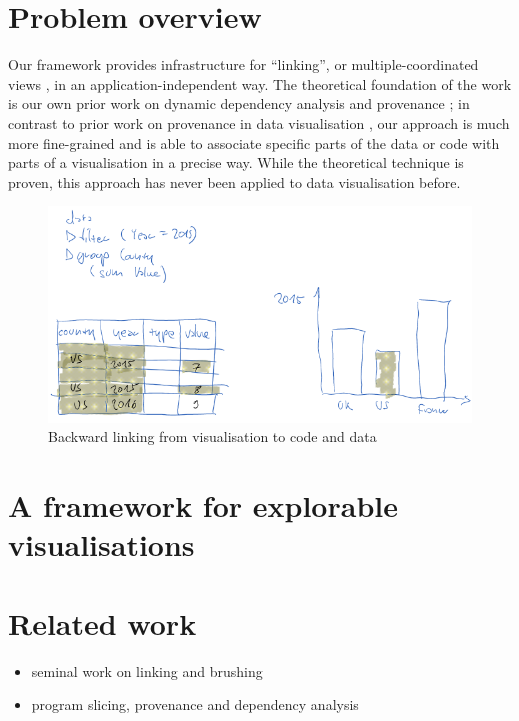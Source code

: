 \cite{becker87,buja91}

\section{Problem overview}

Our framework provides infrastructure for ``linking'', or multiple-coordinated
views \cite{tobiasz09}, in an application-independent way. The theoretical
foundation of the work is our own prior work on dynamic dependency analysis and
provenance \cite{perera16d, ricciotti17}; in contrast to prior work on
provenance in data visualisation \cite{callahan06}, our approach is much more
fine-grained and is able to associate specific parts of the data or code with
parts of a visualisation in a precise way. While the theoretical technique is
proven, this approach has never been applied to data visualisation before.

\begin{figure}[H]
\includegraphics[scale=0.35]{image/chart-bwd}
\caption{Backward linking from visualisation to code and data}
\end{figure}

\section{A framework for explorable visualisations}

\section{Related work}

\begin{itemize}
  \item seminal work on linking and brushing
  \item program slicing, provenance and dependency analysis
\end{itemize}

